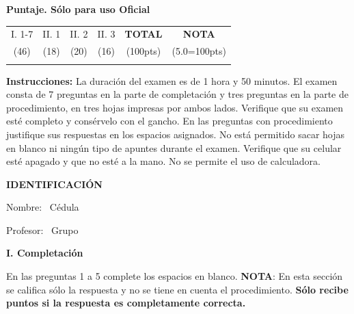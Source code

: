 \documentclass[11pt]{article}
\begin{document}
\examheader

\vspace{4pt}
\noindent
\begin{minipage}[t]{0.72\linewidth}
\textbf{Puntaje. Sólo para uso Oficial}\\[4pt]
\begin{tabular}{|c|c|c|c|c|c|}
\hline
I. 1-7 & II. 1 & II. 2 & II. 3 & \textbf{TOTAL} & \textbf{NOTA} \\
(46) & (18) & (20) & (16) & (100pts) & (5.0=100pts) \\ \hline
 & & & & & \\ \hline
\end{tabular}
\end{minipage}

\vspace{6pt}
\noindent\textbf{Instrucciones:} La duración del examen es de 1 hora y 50 minutos. El examen consta de 7 preguntas en la parte de completación y tres preguntas en la parte de procedimiento, en tres hojas impresas por ambos lados. Verifique que su examen esté completo y consérvelo con el gancho. En las preguntas con procedimiento justifique sus respuestas en los espacios asignados. No está permitido sacar hojas en blanco ni ningún tipo de apuntes durante el examen. Verifique que su celular esté apagado y que no esté a la mano. No se permite el uso de calculadora.

\vspace{6pt}
\noindent\textbf{IDENTIFICACIÓN}

\vspace{8pt}
\noindent Nombre: \dotfill\ Cédula \dotfill

\vspace{4pt}
\noindent Profesor: \dotfill\ Grupo \dotfill

\vspace{8pt}

\newpage
\noindent\textbf{\large I. Completación}

\vspace{2pt}
\noindent En las preguntas 1 a 5 complete los espacios en blanco. \textbf{NOTA}: En esta sección se califica sólo la respuesta y no se tiene en cuenta el procedimiento. \textbf{Sólo recibe puntos si la respuesta es completamente correcta.}
\end{document}
